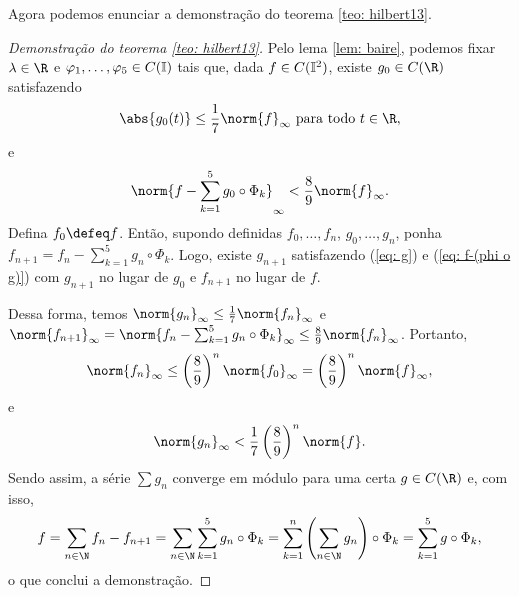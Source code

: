 Agora podemos enunciar a demonstração do teorema \ref{teo: hilbert13}.
\begin{proof}[Demonstração do teorema \ref{teo: hilbert13}]
    Pelo lema \ref{lem: baire}, podemos fixar \( \lambda \in \R \) e \( \varphi_{ 1 }, \dots, \varphi_{ 5 } \in C(\mathbb{I}) \) tais que, dada \( f \in C(\mathbb{I}^2) \), existe \( g_{ 0 } \in C(\R) \) satisfazendo
    \begin{equation}
        \abs{ g_{ 0 }(t) } \leq \frac{ 1 }{ 7 } \norm{ f }_{ \infty } \text{ para todo } t \in \R
        \label{eq: g}
    ,\end{equation}
    e
    \begin{equation}
        \norm{ 
            f -
            \sum_{ k=1 }^{ 5 } g_{ 0 } \circ \Phi_{ k }
         }_{ \infty }
         < \frac{ 8 }{ 9 } \norm{ f }_{ \infty }
         \label{eq: f-(phi o g)}
    .\end{equation}
    Defina \( f_{ 0 } \defeq f \). Então, supondo definidas \( f_{ 0 }, \dots, f_{ n } \), \( g_{ 0 }, \dots, g_{ n } \), ponha \( f_{ n+1 } = f_{ n } - \sum_{ k=1 }^{ 5 } g_{ n } \circ \Phi_{ k } \).
    Logo, existe \( g_{ n+1 } \) satisfazendo (\ref{eq: g}) e (\ref{eq: f-(phi o g)}) com \( g_{ n+1 } \) no lugar de \( g_{ 0 } \) e \( f_{ n+1 } \) no lugar de \( f \).
    
    Dessa forma, temos \( \norm{ g_{ n } }_{ \infty } \leq \frac{ 1 }{ 7 } \norm{ f_{ n } }_{ \infty } \) e \( \norm{ f_{ n+1 } }_{ \infty } = \norm{ f_{ n } - \sum_{ k=1 }^{ 5 } g_{ n } \circ \Phi_{ k } }_{ \infty } \leq \frac{ 8 }{ 9 } \norm{ f_{ n } }_{ \infty } \).
    Portanto,
    \begin{equation}
        \norm{ f_{ n } }_{ \infty } \leq \left( \frac{ 8 }{ 9 } \right)^{ n } \norm{ f_{ 0 } }_{ \infty } = \left( \frac{ 8 }{ 9 } \right)^{ n } \norm{ f }_{ \infty }
    ,\end{equation}
    e
    \begin{equation}
        \norm{ g_{ n } }_{ \infty } <
        \frac{ 1 }{ 7 } \left( \frac{ 8 }{ 9 } \right)^{ n } \norm{ f }
    .\end{equation}
    Sendo assim, a série \( \sum g_{ n } \) converge em módulo para uma certa \( g \in C(\R) \) e, com isso,
    \begin{equation}
        f = \sum_{ n\in\N } f_{ n } - f_{ n+1 }
        = \sum_{ n\in\N } \sum_{ k=1 }^{ 5 } g_{ n } \circ \Phi_{ k }
        = \sum_{ k=1 }^{ n } \left( 
            \sum_{ n\in\N } g_{ n }
         \right)
         \circ \Phi_{ k }
        = \sum_{ k=1 }^{ 5 } g \circ \Phi_{ k }
    ,\end{equation}
    o que conclui a demonstração.
\end{proof}